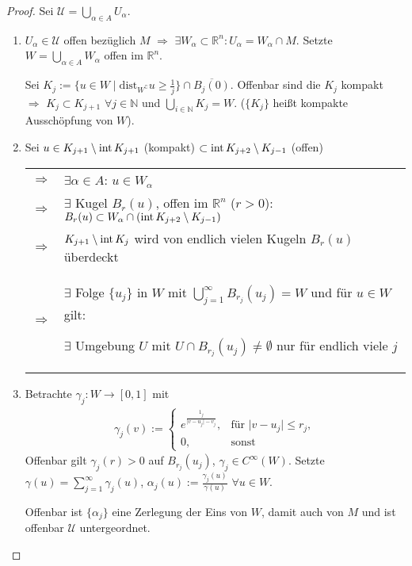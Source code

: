 \begin{proof}
	Sei $\mathcal{U} = \bigcup_{\alpha\in A} U_\alpha$.
	\vspace*{-0.8\baselineskip}
	\begin{enumerate}[label={\alph*)}]
		\item $U_\alpha\in\mathcal{U}$ offen bezüglich $M$ $\Rightarrow$ $\exists W_\alpha\subset\mathbb{R}^n\colon U_\alpha = W_\alpha\cap M$. Setzte $W = \bigcup_{\alpha\in A} W_\alpha$ offen im $\mathbb{R}^n$.
		
		Sei $K_{j} := \{ u\in W \mid \mathrm{dist}_{W^\complement} u \ge \frac{1}{j} \} \cap \overline{B_j(0)}$. Offenbar sind die $K_j$ kompakt \\
		\hspace*{0.5em} $\Rightarrow$ $K_j \subset K_{j+1}$ $\forall j\in\mathbb{N}$ und $\bigcup_{i\in\mathbb{N}} K_j = W$. ($\{K_j\}$ heißt kompakte Ausschöpfung von $W$).
		
		\item Sei $u\in K_{j+1}\setminus \operatorname{int} K_{j+1}$ (kompakt) $\subset \operatorname{int} K_{j+2}\setminus K_{j-1}$ (offen) \\\begin{tabularx}{\linewidth}{r@{$\;\;$}X}
			$\Rightarrow$ & $\exists \alpha\in A$: $u\in W_\alpha$ \\
			$\Rightarrow$ & $\exists$ Kugel $B_r(u)$, offen im $\mathbb{R}^n$ ($r > 0$): $B_r(u) \subset W_\alpha \cap (\operatorname{int} K_{j+2}\setminus K_{j-1})$ \\
			$\Rightarrow$ & $K_{j+1}\setminus \operatorname{int} K_j$ wird von endlich vielen Kugeln $B_r(u)$ überdeckt \\
			$\Rightarrow$ & $\exists$ Folge $\{u_j\}$ in $W$ mit $\bigcup_{j=1}^\infty B_{r_j}(u_j) = W$ und für $u\in W$ gilt:
			
			\hspace*{0.5em}$\exists$ Umgebung $U$ mit $U\cap B_{r_j}(u_j)\neq \emptyset$ nur für endlich viele $j$
		\end{tabularx}
		\item Betrachte $\gamma_j\colon W\to [0,1]$ mit\begin{align*}
			\gamma_j (v) := \begin{cases}
				e^{\frac{1_j}{\vert v - u_j\vert - v_j}}, & \text{für }\vert v - u_j\vert \le r_j,\\
				0, & \text{sonst}
			\end{cases}
		\end{align*}
		Offenbar gilt $\gamma_j(r)>0$ auf $B_{r_j}(u_j)$, $\gamma_j\in C^\infty(W)$. Setzte $\gamma(u) = \sum_{j=1}^\infty \gamma_j(u)$, $\alpha_j(u) := \frac{\gamma_j(u)}{\gamma(u)}$ $\forall u\in W$.
		
		Offenbar ist $\{\alpha_j \}$ eine Zerlegung der Eins von $W$, damit auch von $M$ und ist offenbar $\mathcal{U}$ untergeordnet.
	\end{enumerate}
\end{proof}